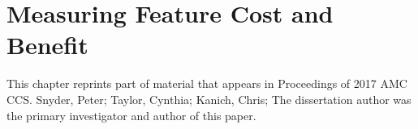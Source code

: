 \chapter{Measuring Feature Cost and Benefit}
\label{cost-benefit}

This chapter reprints part of material that appears in
Proceedings of 2017 AMC CCS. Snyder, Peter; Taylor,
Cynthia; Kanich, Chris; The dissertation author was the primary investigator and
author of this paper.






